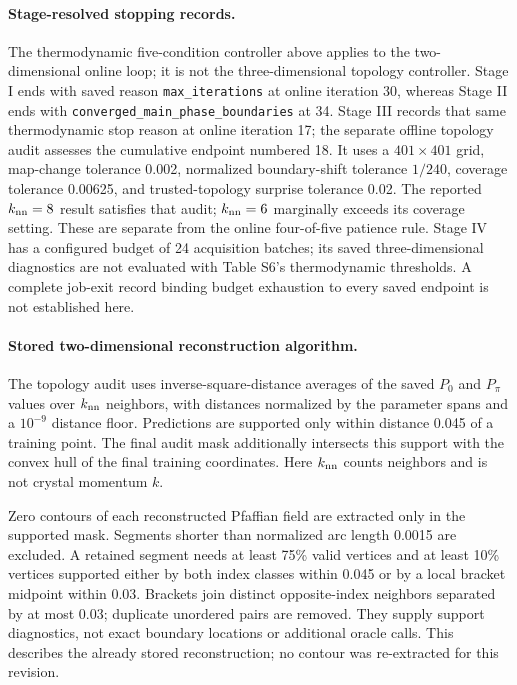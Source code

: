 \paragraph{Stage-resolved stopping records.}
The thermodynamic five-condition controller above applies to the two-dimensional online loop; it is not the three-dimensional topology controller. Stage I ends with saved reason \texttt{max\_iterations} at online iteration 30, whereas Stage II ends with \texttt{converged\_main\_phase\_boundaries} at 34. Stage III records that same thermodynamic stop reason at online iteration 17; the separate offline topology audit assesses the cumulative endpoint numbered 18. It uses a $401\times401$ grid, map-change tolerance 0.002, normalized boundary-shift tolerance $1/240$, coverage tolerance 0.00625, and trusted-topology surprise tolerance 0.02. The reported $k_{\rm nn}=8$ result satisfies that audit; $k_{\rm nn}=6$ marginally exceeds its coverage setting. These are separate from the online four-of-five patience rule. Stage IV has a configured budget of 24 acquisition batches; its saved three-dimensional diagnostics are not evaluated with Table S6's thermodynamic thresholds. A complete job-exit record binding budget exhaustion to every saved endpoint is not established here.

\paragraph{Stored two-dimensional reconstruction algorithm.}
The topology audit uses inverse-square-distance averages of the saved $P_0$ and $P_\pi$ values over $k_{\rm nn}$ neighbors, with distances normalized by the parameter spans and a $10^{-9}$ distance floor. Predictions are supported only within distance 0.045 of a training point. The final audit mask additionally intersects this support with the convex hull of the final training coordinates. Here $k_{\rm nn}$ counts neighbors and is not crystal momentum $k$.

Zero contours of each reconstructed Pfaffian field are extracted only in the supported mask. Segments shorter than normalized arc length 0.0015 are excluded. A retained segment needs at least 75\% valid vertices and at least 10\% vertices supported either by both index classes within 0.045 or by a local bracket midpoint within 0.03. Brackets join distinct opposite-index neighbors separated by at most 0.03; duplicate unordered pairs are removed. They supply support diagnostics, not exact boundary locations or additional oracle calls. This describes the already stored reconstruction; no contour was re-extracted for this revision.

